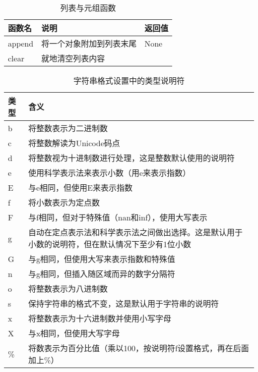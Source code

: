 \begin{table}
    \caption{列表与元组函数}
    \begin{tabularx}{\textwidth}{lXl}
        \hline
        函数名    & 说明           & 返回值  \\
        \hline
        append & 将一个对象附加到列表末尾 & None \\
        clear  & 就地清空列表内容     &      \\
        \hline
    \end{tabularx}
\end{table}


\begin{table}
    \caption{字符串格式设置中的类型说明符}
    \label{StringFormatTypeDescription}
    \begin{tabularx}{\textwidth}{lX}
        \hline
        类型 & 含义                                               \\
        \hline
        b  & 将整数表示为二进制数                                       \\
        c  & 将整数解读为Unicode码点                                  \\
        d  & 将整数视为十进制数进行处理，这是整数默认使用的说明符                       \\
        e  & 使用科学表示法来表示小数（用e来表示指数）                            \\
        E  & 与e相同，但使用E来表示指数                                   \\
        f  & 将小数表示为定点数                                        \\
        F  & 与f相同，但对于特殊值（nan和inf），使用大写表示                      \\
        g  & 自动在定点表示法和科学表示法之间做出选择。这是默认用于小数的说明符，但在默认情况下至少有1位小数 \\
        G  & 与g相同，但使用大写来表示指数和特殊值                              \\
        n  & 与g相同，但插入随区域而异的数字分隔符                              \\
        o  & 将整数表示为八进制数                                       \\
        s  & 保持字符串的格式不变，这是默认用于字符串的说明符                         \\
        x  & 将整数表示为十六进制数并使用小写字母                               \\
        X  & 与x相同，但使用大写字母                                     \\
        \% & 将数表示为百分比值（乘以100，按说明符f设置格式，再在后面加上\%）              \\
        \hline
    \end{tabularx}
\end{table}

